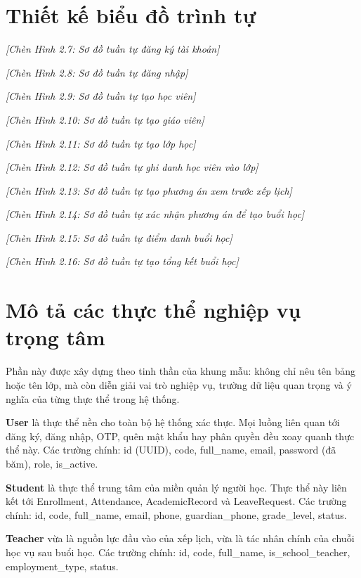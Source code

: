 \documentclass[../DoAn.tex]{subfiles}
\begin{document}
\section{Thiết kế biểu đồ trình tự}
\label{section:2.5}

\textit{[Chèn Hình 2.7: Sơ đồ tuần tự đăng ký tài khoản]}

\textit{[Chèn Hình 2.8: Sơ đồ tuần tự đăng nhập]}

\textit{[Chèn Hình 2.9: Sơ đồ tuần tự tạo học viên]}

\textit{[Chèn Hình 2.10: Sơ đồ tuần tự tạo giáo viên]}

\textit{[Chèn Hình 2.11: Sơ đồ tuần tự tạo lớp học]}

\textit{[Chèn Hình 2.12: Sơ đồ tuần tự ghi danh học viên vào lớp]}

\textit{[Chèn Hình 2.13: Sơ đồ tuần tự tạo phương án xem trước xếp lịch]}

\textit{[Chèn Hình 2.14: Sơ đồ tuần tự xác nhận phương án để tạo buổi học]}

\textit{[Chèn Hình 2.15: Sơ đồ tuần tự điểm danh buổi học]}

\textit{[Chèn Hình 2.16: Sơ đồ tuần tự tạo tổng kết buổi học]}

\section{Mô tả các thực thể nghiệp vụ trọng tâm}
\label{section:2.6}

Phần này được xây dựng theo tinh thần của khung mẫu: không chỉ nêu tên bảng hoặc tên lớp, mà còn diễn giải vai trò nghiệp vụ, trường dữ liệu quan trọng và ý nghĩa của từng thực thể trong hệ thống.

\textbf{User} là thực thể nền cho toàn bộ hệ thống xác thực. Mọi luồng liên quan tới đăng ký, đăng nhập, OTP, quên mật khẩu hay phân quyền đều xoay quanh thực thể này. Các trường chính: id (UUID), code, full\_name, email, password (đã băm), role, is\_active.

\textbf{Student} là thực thể trung tâm của miền quản lý người học. Thực thể này liên kết tới Enrollment, Attendance, AcademicRecord và LeaveRequest. Các trường chính: id, code, full\_name, email, phone, guardian\_phone, grade\_level, status.

\textbf{Teacher} vừa là nguồn lực đầu vào của xếp lịch, vừa là tác nhân chính của chuỗi học vụ sau buổi học. Các trường chính: id, code, full\_name, is\_school\_teacher, employment\_type, status.
\end{document}
